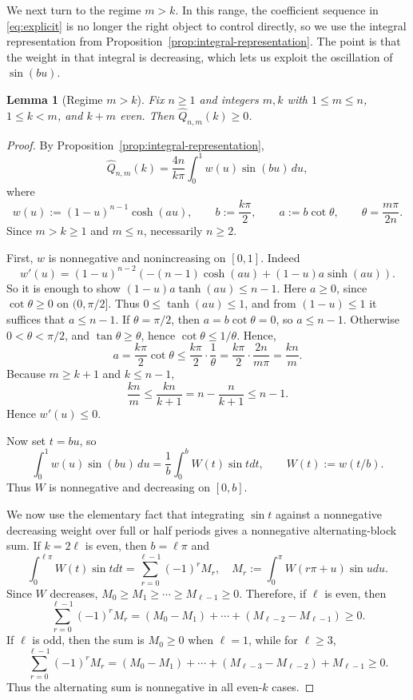 \documentclass[a4paper,12pt]{amsart}
\newtheorem{lemma}[theorem]{Lemma}
\theoremstyle{definition}
\theoremstyle{remark}
\begin{document}
We next turn to the regime $m > k$. In this range, the coefficient sequence in \eqref{eq:explicit} is no longer the right object to control directly, so we use the integral representation from Proposition~\ref{prop:integral-representation}. The point is that the weight in that integral is decreasing, which lets us exploit the oscillation of $\sin(bu)$.

\begin{lemma}[Regime $m>k$]\label{lem:m-gt-k}
Fix $n\ge1$ and integers $m,k$ with $1\le m\le n$, $1\le k<m$, and $k+m$ even.
Then $\widehat Q_{n,m}(k)\ge0$.
\end{lemma}

\begin{proof}
By Proposition~\ref{prop:integral-representation},
\[
\widehat Q_{n,m}(k)=\frac{4n}{k\pi}\int_0^1 w(u)\sin(bu)\,du,
\]
where
\[
w(u):=(1-u)^{n-1}\cosh(au),\qquad
b:=\frac{k\pi}{2},\qquad
a:=b\cot\theta, \qquad \theta=\frac{m\pi}{2n}.
\]
Since $m>k\ge1$ and $m\le n$, necessarily $n\ge2$.

First, $w$ is nonnegative and nonincreasing on $[0,1]$.
Indeed
\[
w'(u)=(1-u)^{n-2}\!\left(-(n-1)\cosh(au)+(1-u)a\sinh(au)\right).
\]
So it is enough to show $(1-u)a\tanh(au)\le n-1$. Here $a \ge 0$, since $\cot\theta \ge 0$ on $(0,\pi/2]$. Thus $0\le\tanh(au)\le1$, and from $(1-u) \le 1$ it suffices that $a\le n-1$. If \(\theta=\pi/2\), then \(a = b\cot\theta =0\), so \(a\le n-1\). Otherwise \(0< \theta < \pi/2\), and \(\tan\theta\ge \theta\), hence \(\cot\theta\le 1/\theta\). Hence,
\[
a=\frac{k\pi}{2}\cot\theta\le \frac{k\pi}{2}\cdot\frac1\theta
=\frac{k\pi}{2}\cdot\frac{2n}{m\pi}=\frac{kn}{m}.
\]
Because $m\ge k+1$ and $k\le n-1$,
\[
\frac{kn}{m}\le\frac{kn}{k+1}=n-\frac{n}{k+1}\le n-1.
\]
Hence $w'(u)\le0$.

Now set $t=bu$, so
\[
\int_0^1 w(u)\sin(bu)\,du
=\frac1b\int_0^b W(t)\sin t dt,\qquad W(t):=w(t/b).
\]
Thus $W$ is nonnegative and decreasing on $[0,b]$.

We now use the elementary fact that integrating $\sin t$ against a nonnegative decreasing weight over full or half periods gives a nonnegative alternating-block sum. If $k = 2\ell$ is even, then $b = \ell\pi$ and
\[
\int_0^{\ell\pi}W(t)\sin t dt
= \sum_{r=0}^{\ell-1}(-1)^rM_r,\quad
M_r:= \int_0^\pi W(r\pi+u) \sin u du.
\]
Since $W$ decreases, $M_0 \ge M_1\ge\cdots\ge M_{\ell-1} \ge 0$. Therefore, if $\ell$ is even, then 
\[ 
\sum_{r=0}^{\ell-1}(-1)^rM_r = (M_0-M_1) + \cdots + (M_{\ell-2}-M_{\ell-1}) \ge 0.
\]
If $\ell$ is odd, then the sum is $M_0 \ge 0$ when $\ell=1$, while for $\ell\ge3$,
\[
\sum_{r=0}^{\ell-1}(-1)^rM_r
= (M_0-M_1) + \cdots + (M_{\ell-3}-M_{\ell-2})+M_{\ell-1} \ge 0.
\]
Thus the alternating sum is nonnegative in all even-$k$ cases.



\end{proof}
\end{document}
